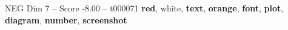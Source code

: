 \begin{textsample}{NEG Dim 7 – Score -8.00 – t000071}  \label{ex:f7_neg_002}
\textbf{red}, white, \textbf{text}, \textbf{orange}, \textbf{font}, \textbf{plot}, \textbf{diagram}, \textbf{number}, \textbf{screenshot}

\end{textsample}
